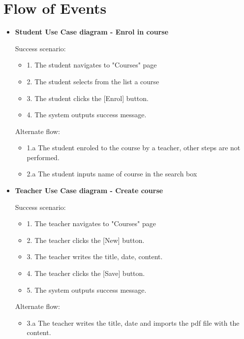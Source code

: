 \documentclass[12pt,a4paper,titlepage]{article}
\begin{document}
\section{Flow of Events}
\begin{itemize}
\item
\noindent\textbf{Student Use Case diagram - Enrol in course}
\begin{description}
    \item[Success scenario:]
\end{description}
\renewcommand{\labelenumii}{\arabic{enumii}}
\begin{itemize}
  \item 1. The student navigates to "Courses" page
  \item 2. The student selects from the list a course
  \item 3. The student clicks the [Enrol] button.
  \item 4. The system outputs success message.
\end{itemize}
\begin{description}
    \item[Alternate flow:]
\end{description}
\begin{itemize}
  \item 1.a The student enroled to the course by a teacher, other steps are not performed.
  \item 2.a The student inputs name of course in the search box
\end{itemize}

\clearpage

\item
\noindent\textbf{Teacher Use Case diagram - Create course}
\begin{description}
    \item[Success scenario:]
\end{description}
\renewcommand{\labelenumii}{\arabic{enumii}}
\begin{itemize}
  \item 1. The teacher navigates to "Courses" page
  \item 2. The teacher clicks the [New] button.
  \item 3. The teacher writes the title, date, content.
  \item 4. The teacher clicks the [Save] button.
  \item 5. The system outputs success message.
\end{itemize}
\begin{description}
    \item[Alternate flow:]
\end{description}
\begin{itemize}
  \item 3.a The teacher writes the title, date and imports the pdf file with the content.
\end{itemize}


\end{itemize}
\end{document}

